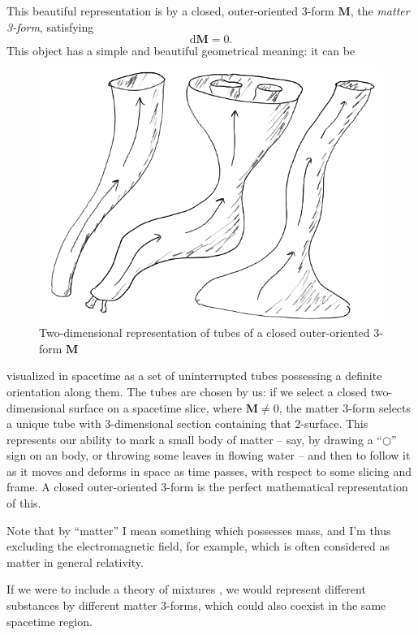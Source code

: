 \documentclass[\ifafour a4paper,12pt,\else a5paper,10pt,\fi%
onecolumn,oneside,article,%
british%
]{memoir}
\theoremstyle{remark}
\theoremstyle{innote}
\newcommand*{\citep}{\parencites}
\newcommand*{\di}{\mathrm{d}}%
\renewcommand*{\|}{\nonscript\,\vert\nonscript\;\mathopen{}}
\newcommand*{\eg}{{e.g.}}
\newcommand*{\yrr}{M}
\newcommand*{\yr}{\bm{\yrr}}
\begin{document}
This beautiful representation is by a closed, outer-oriented 3-form $\yr$,
the \emph{matter 3-form}, satisfying
\begin{equation}
  \label{eq:mass_density_closed_three_form}
  \di\yr=0.
\end{equation}
This object has a simple and beautiful geometrical meaning: it can be
\setlength{\intextsep}{0.0ex}%
\begin{figure}
  \includegraphics[width=\linewidth]{mass_tubes2.png}\\
  \centering\footnotesize Two-dimensional representation of tubes of a
  closed outer-oriented 3-form $\yr$
\end{figure}
visualized in spacetime as a set of uninterrupted tubes possessing a
definite orientation along them. The tubes are chosen by us: if we select a
closed two-dimensional surface on a spacetime slice, where $\yr \ne 0$, the
matter 3-form selects a unique tube with 3-dimensional section containing
that 2-surface. This represents our ability to mark a small body of matter
-- say, by drawing a \enquote{$\mathord{\bigcirc}$} sign on an body, or
throwing some leaves in flowing water -- and then to follow it as it moves
and deforms in space as time passes, with respect to some slicing and
frame. A closed outer-oriented 3-form is the perfect mathematical
representation of this.

Note that by \enquote{matter} I mean something which possesses mass, and
I'm thus excluding the electromagnetic field, for example, which is often
considered as matter in general relativity.

If we were to include a theory
of mixtures \citep[\eg][app.~5B]{truesdell1969_r1984}, we would represent
different substances by different matter 3-forms, which could also coexist
in the same spacetime region.
\end{document}

